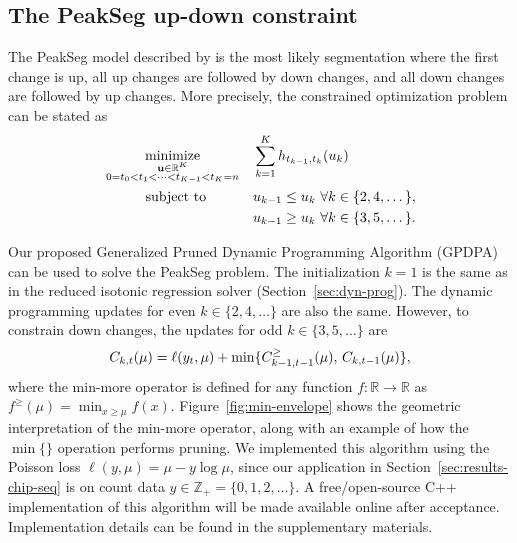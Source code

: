 \documentclass{article}
\DeclareMathOperator*{\minimize}{minimize}
\newcommand{\ZZ}{\mathbb Z}
\newcommand{\RR}{\mathbb R}
\begin{document}
\subsection{The PeakSeg up-down constraint}
\label{sec:PeakSeg}

The PeakSeg model described by \citet{HOCKING-PeakSeg} is the most
likely segmentation where the first change is up, all up changes are
followed by down changes, and all down changes are followed by up
changes. More precisely, the constrained optimization problem can be
stated as
\begin{align}
  \label{eq:PeakSeg}
  &\minimize_{
        \substack{\mathbf u\in\RR^K \\
    0=t_0<t_1<\cdots<t_{K-1}<t_K=n
}
    } && 
  \sum_{k=1}^K h_{t_{k-1}, t_k}(u_k)\\
  &\text{\hskip 1.05cm subject to} && u_{k-1} \leq u_k\ \forall k\in\{2,4,\dots\},
  \nonumber\\
  & && u_{k-1} \geq u_k\ \forall k\in\{3,5,\dots\}.
  \nonumber
\nonumber
\end{align}

Our proposed Generalized Pruned Dynamic Programming Algorithm (GPDPA)
can be used to solve the PeakSeg problem. The initialization $k=1$ is
the same as in the reduced isotonic regression solver
(Section~\ref{sec:dyn-prog}). The dynamic programming updates for even
$k\in\{2, 4, \dots\}$ are also the same. However, to constrain down
changes, the updates for odd $k\in\{3, 5, \dots\}$ are
\begin{equation}
  C_{k,t}(\mu) = \ell(y_t, \mu) + \min\{
  C_{k-1,t-1}^\geq(\mu),\, C_{k,t-1}(\mu)
  \},
\end{equation}
where the min-more operator is defined for any function $f:\RR\rightarrow\RR$ as
$f^\geq(\mu) = \min_{x\geq \mu} f(x)$. Figure~\ref{fig:min-envelope}
shows the geometric interpretation of the min-more operator, along
with an example of how the $\min\{\}$ operation performs pruning.
We implemented this algorithm using the Poisson loss
$\ell(y, \mu) = \mu - y\log \mu$, since our application in
Section~\ref{sec:results-chip-seq} is on count data
$y\in\ZZ_+ = \{0, 1, 2, \dots\}$.
A free/open-source C++ implementation of this algorithm will be made
available online after acceptance. Implementation details can be
found in the supplementary materials.
\end{document}
